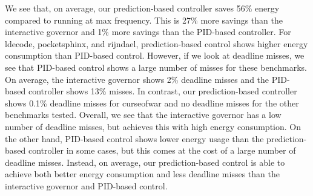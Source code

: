 We see that, on average, our prediction-based controller saves 56\% energy
compared to running at max frequency. This is 27\% more savings than the
interactive governor and 1\% more savings than the PID-based controller.
For ldecode, pocketsphinx, and rijndael, prediction-based control shows higher energy
consumption than PID-based control. However, if we look at deadline misses,
we see that PID-based control shows a large number of misses for these
benchmarks. On average, the interactive governor shows 2\% deadline misses and the
PID-based controller shows 13\% misses. In contrast, our prediction-based controller
shows 0.1\% deadline misses for curseofwar and no deadline misses for the other
benchmarks tested.
Overall, we see that the interactive governor
has a low number of deadline misses, but achieves this with high energy
consumption. On the other hand, PID-based control shows lower energy usage than
the prediction-based controller in some cases, but this comes at the cost of a large number of deadline misses.
Instead, on average, our prediction-based control is able to achieve
both better energy consumption and less deadline misses than the interactive
governor and PID-based control.


